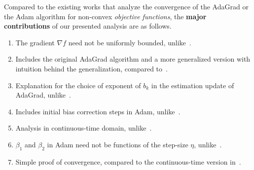 Compared to the existing works that analyze the convergence of the AdaGrad or the Adam algorithm for non-convex {\em objective functions}, the \textbf{major contributions} of our presented analysis are as follows.

\begin{enumerate}
    \item The gradient $\nabla f$ need not be uniformly bounded, unlike~\cite{defossez2020simple, reddi2018adaptive, de2018convergence, tong2019calibrating, chen2018convergence}.
    \item Includes the original AdaGrad algorithm and a more generalized version with intuition behind the generalization, compared to~\cite{li2019convergence}.
    \item Explanation for the choice of exponent of $b_k$ in the estimation update of AdaGrad, unlike~\cite{li2019convergence}.
    \item Includes initial bias correction steps in Adam, unlike~\cite{reddi2018adaptive, de2018convergence, tong2019calibrating, barakat2020convergence, chen2018convergence}.
    \item Analysis in continuous-time domain, unlike~\cite{li2019convergence, defossez2020simple, reddi2018adaptive, de2018convergence, tong2019calibrating, barakat2020convergence, chen2018convergence}.
    \item $\beta_1$ and $\beta_2$ in Adam need not be functions of the step-size $\eta$, unlike~\cite{barakat2021convergence}. 
    \item Simple proof of convergence, compared to the continuous-time version in~\cite{barakat2021convergence}.
\end{enumerate}







